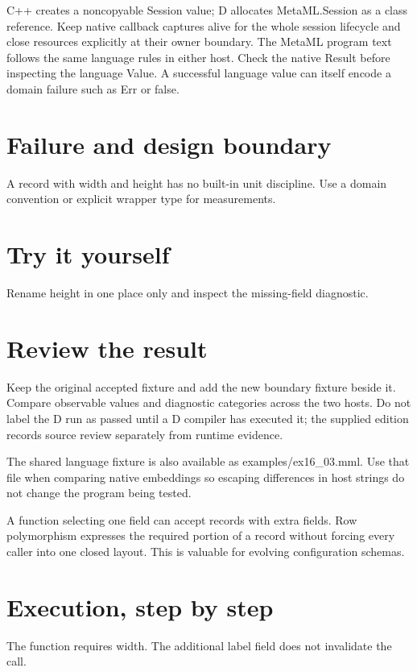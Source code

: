 \clearpage
{}
C++ creates a noncopyable Session value; D allocates MetaML.Session as a class reference. Keep native callback captures alive for the whole session lifecycle and close resources explicitly at their owner boundary. The MetaML program text follows the same language rules in either host. Check the native Result before inspecting the language Value. A successful language value can itself encode a domain failure such as Err or false.


\section*{Failure and design boundary}
A record with width and height has no built-in unit discipline. Use a domain convention or explicit wrapper type for measurements.

\section*{Try it yourself}
Rename height in one place only and inspect the missing-field diagnostic.

\section*{Review the result}
Keep the original accepted fixture and add the new boundary fixture beside it. Compare observable values and diagnostic categories across the two hosts. Do not label the D run as passed until a D compiler has executed it; the supplied edition records source review separately from runtime evidence.

The shared language fixture is also available as examples/ex16\_03.mml. Use that file when comparing native embeddings so escaping differences in host strings do not change the program being tested.

\clearpage
{}
A function selecting one field can accept records with extra fields. Row polymorphism expresses the required portion of a record without forcing every caller into one closed layout. This is valuable for evolving configuration schemas.


\section*{Execution, step by step}
The function requires width. The additional label field does not invalidate the call.

